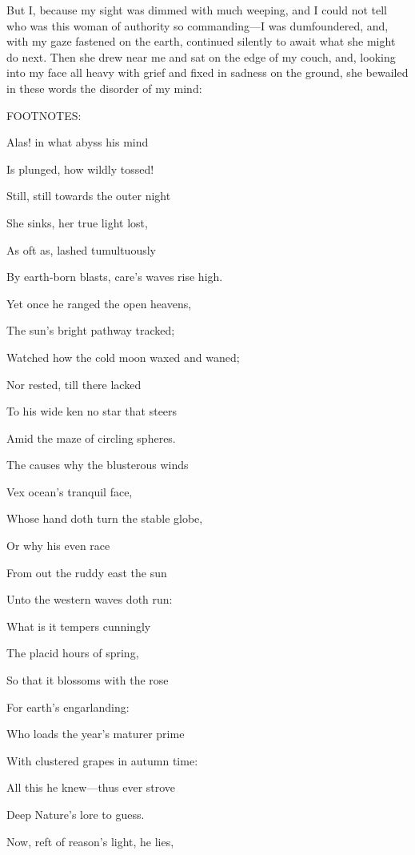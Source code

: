 But I, because my sight was dimmed with much weeping, and I could not
tell who was this woman of authority so commanding—I was dumfoundered,
and, with my gaze fastened on the earth, continued silently to await
what she might do next. Then she drew near me and sat on the edge of my
couch, and, looking into my face all heavy with grief and fixed in
sadness on the ground, she bewailed in these words the disorder of my
mind:

FOOTNOTES:


Alas! in what abyss his mind

Is plunged, how wildly tossed!

Still, still towards the outer night

She sinks, her true light lost,

As oft as, lashed tumultuously

By earth-born blasts, care's waves rise high.

Yet once he ranged the open heavens,

The sun's bright pathway tracked;

Watched how the cold moon waxed and waned;

Nor rested, till there lacked

To his wide ken no star that steers

Amid the maze of circling spheres.

The causes why the blusterous winds

Vex ocean's tranquil face,

Whose hand doth turn the stable globe,

Or why his even race

From out the ruddy east the sun

Unto the western waves doth run:

What is it tempers cunningly

The placid hours of spring,

So that it blossoms with the rose

For earth's engarlanding:

Who loads the year's maturer prime

With clustered grapes in autumn time:

All this he knew—thus ever strove

Deep Nature's lore to guess.

Now, reft of reason's light, he lies,


